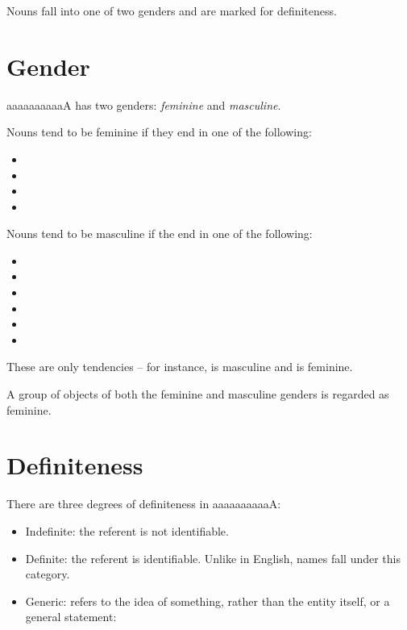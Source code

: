 \documentclass{book}
\newcommand{\lname}{aaaaaaaaaaA}
\begin{document}
Nouns fall into one of two genders and are marked for definiteness.

\section{Gender}

\lname{} has two genders: \emph{feminine} and \emph{masculine}.

Nouns tend to be feminine if they end in one of the following:

\begin{itemize}
  \item {}
  \item {}
  \item {}
  \item {}
\end{itemize}

Nouns tend to be masculine if the end in one of the following:

\begin{itemize}
  \item {}
  \item {}
  \item {}
  \item {}
  \item {}
  \item {}
\end{itemize}

These are only tendencies -- for instance,  is masculine and  is feminine.

A group of objects of both the feminine and masculine genders is regarded as feminine.

\section{Definiteness}

There are three degrees of definiteness in \lname:

\begin{itemize}
  \item Indefinite: the referent is not identifiable.
  \item Definite: the referent is identifiable. Unlike in English, names fall under this category.
  \item Generic: refers to the idea of something, rather than the entity itself, or a general statement: \\
  ~\\
      \\
      \\
      \\
  ~\\
      \\
      \\
    
\end{itemize}
\end{document}
